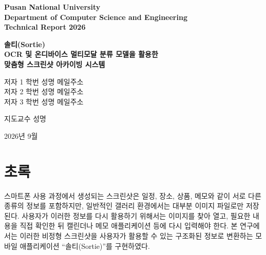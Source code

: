 \documentclass[11pt,a4paper]{article}
\newcommand{\placeholder}[1]{\fbox{\parbox{0.94\linewidth}{\textbf{[#1]}}}}
\begin{document}
\begin{titlepage}
\begin{flushright}
\textbf{Pusan National University}\\
\textbf{Department of Computer Science and Engineering}\\
\textbf{Technical Report 2026}
\end{flushright}

\vspace*{3.2cm}

\begin{center}
{\Huge\bfseries 솔티(Sortie)}\\[0.8cm]
{\Large\bfseries OCR 및 온디바이스 멀티모달 분류 모델을 활용한 
}\\
{\Large\bfseries 맞춤형 스크린샷 아카이빙 시스템}

\vspace{2.8cm}

\placeholder{부산대학교 로고 삽입}

\vspace{2.5cm}

{\large
저자 1 학번 성명 메일주소\\[0.3cm]
저자 2 학번 성명 메일주소\\[0.3cm]
저자 3 학번 성명 메일주소
}

\vspace{1.4cm}
{\large 지도교수 성명}
\end{center}

\vfill
\begin{center}
2026년 9월
\end{center}
\end{titlepage}

\tableofcontents
\newpage

\section*{초록}

스마트폰 사용 과정에서 생성되는 스크린샷은 일정, 장소, 상품, 메모와 같이 서로 다른 종류의 정보를 포함하지만, 일반적인 갤러리 환경에서는 대부분 이미지 파일로만 저장된다. 사용자가 이러한 정보를 다시 활용하기 위해서는 이미지를 찾아 열고, 필요한 내용을 직접 확인한 뒤 캘린더나 메모 애플리케이션 등에 다시 입력해야 한다. 본 연구에서는 이러한 비정형 스크린샷을 사용자가 활용할 수 있는 구조화된 정보로 변환하는 모바일 애플리케이션 ``솔티(Sortie)''를 구현하였다.
\end{document}
